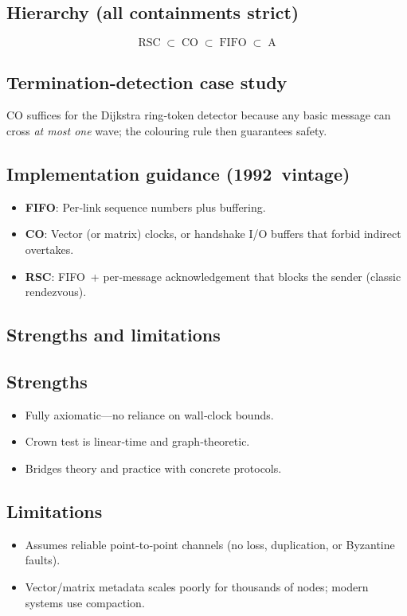 \subsection{Hierarchy (all containments strict)}
\[
  \boxed{\text{RSC}} \;\subset\;
  \boxed{\text{CO}} \;\subset\;
  \boxed{\text{FIFO}} \;\subset\;
  \boxed{\text{A}}
\]

\subsection{Termination‑detection case study}
CO suffices for the Dijkstra ring‑token detector because any basic message can cross \emph{at most one} wave; the colouring rule then guarantees safety.

\subsection{Implementation guidance (1992 vintage)}
\begin{itemize}
  \item \textbf{FIFO}: Per‑link sequence numbers plus buffering.
  \item \textbf{CO}: Vector (or matrix) clocks, or handshake I/O buffers that forbid indirect overtakes.
  \item \textbf{RSC}: FIFO + per‑message acknowledgement that blocks the sender (classic rendezvous).
\end{itemize}

\subsection{Strengths and limitations}

\subsection*{Strengths}
\begin{itemize}
  \item Fully axiomatic—no reliance on wall‑clock bounds.
  \item Crown test is linear‑time and graph‑theoretic.
  \item Bridges theory and practice with concrete protocols.
\end{itemize}

\subsection*{Limitations}
\begin{itemize}
  \item Assumes reliable point‑to‑point channels (no loss, duplication, or Byzantine faults).
  \item Vector/matrix metadata scales poorly for thousands of nodes; modern systems use compaction.
\end{itemize}

